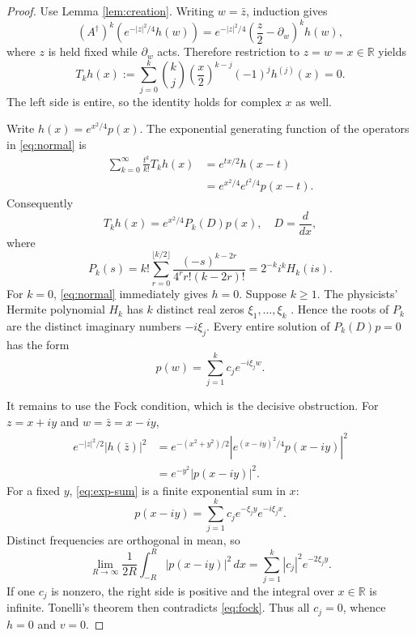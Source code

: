 \documentclass[11pt]{article}
\newcommand{\R}{\mathbb R}
\newcommand{\dd}{\,d}
\newcommand{\pa}{\partial}
\newcommand{\ad}{A^{\dagger}}
\begin{document}
\begin{proof}
Use Lemma \ref{lem:creation}.  Writing $w=\bar z$, induction gives
\[
 (\ad)^k\left(e^{-|z|^2/4}h(w)\right)
 =e^{-|z|^2/4}\left(\frac z2-\pa_w\right)^kh(w),
\]
where $z$ is held fixed while $\pa_w$ acts.  Therefore restriction to
$z=w=x\in\R$ yields
\begin{equation}\label{eq:normal}
 T_kh(x):=\sum_{j=0}^k\binom{k}{j}
 \left(\frac x2\right)^{k-j}(-1)^jh^{(j)}(x)=0.
\end{equation}
The left side is entire, so the identity holds for complex $x$ as well.

Write $h(x)=e^{x^2/4}p(x)$.  The exponential generating function of the
operators in \eqref{eq:normal} is
\begin{align*}
 \sum_{k=0}^{\infty}\frac{t^k}{k!}T_kh(x)
 &=e^{tx/2}h(x-t)\\
 &=e^{x^2/4}e^{t^2/4}p(x-t).
\end{align*}
Consequently
\[
 T_kh(x)=e^{x^2/4}P_k(D)p(x),
 \quad D=\frac{d}{dx},
\]
where
\begin{equation}\label{eq:pk}
 P_k(s)=k!\sum_{r=0}^{\lfloor k/2\rfloor}
 \frac{(-s)^{k-2r}}{4^r r!(k-2r)!}
 =2^{-k}i^kH_k(is).
\end{equation}
For $k=0$, \eqref{eq:normal} immediately gives $h=0$.  Suppose $k\ge1$.
The physicists' Hermite polynomial $H_k$ has $k$ distinct real zeros
$\xi_1,\ldots,\xi_k$ \cite{Szego}.  Hence the roots of $P_k$ are the
distinct imaginary numbers $-i\xi_j$.  Every entire solution of
$P_k(D)p=0$ has the form
\begin{equation}\label{eq:exp-sum}
 p(w)=\sum_{j=1}^kc_je^{-i\xi_jw}.
\end{equation}

It remains to use the Fock condition, which is the decisive obstruction.
For $z=x+iy$ and $w=\bar z=x-iy$,
\begin{align*}
 e^{-|z|^2/2}|h(\bar z)|^2
 &=e^{-(x^2+y^2)/2}
   \left|e^{(x-iy)^2/4}p(x-iy)\right|^2\\
 &=e^{-y^2}|p(x-iy)|^2.
\end{align*}
For a fixed $y$, \eqref{eq:exp-sum} is a finite exponential sum in $x$:
\[
 p(x-iy)=\sum_{j=1}^k c_je^{-\xi_jy}e^{-i\xi_jx}.
\]
Distinct frequencies are orthogonal in mean, so
\[
 \lim_{R\to\infty}\frac1{2R}\int_{-R}^{R}|p(x-iy)|^2\dd x
 =\sum_{j=1}^k|c_j|^2e^{-2\xi_jy}.
\]
If one $c_j$ is nonzero, the right side is positive and the integral over
$x\in\R$ is infinite.  Tonelli's theorem then contradicts
\eqref{eq:fock}.  Thus all $c_j=0$, whence $h=0$ and $v=0$.
\end{proof}
\end{document}
